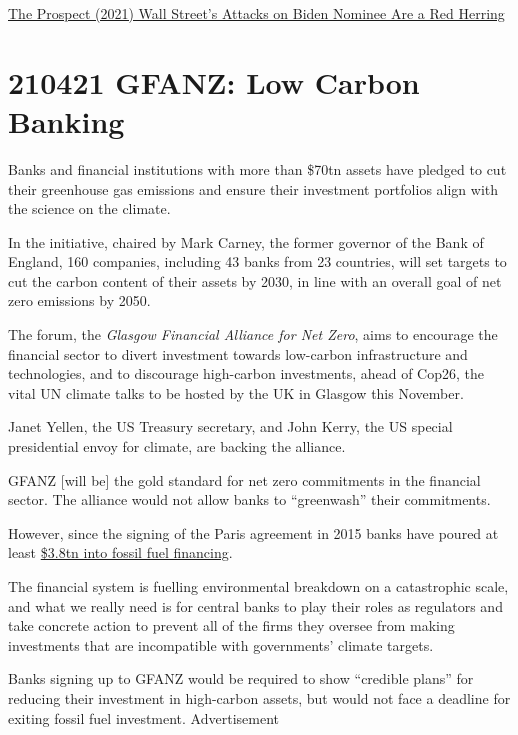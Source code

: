 \documentclass[
]{book}
\begin{document}
\href{https://prospect.org/economy/wall-streets-attacks-on-biden-nominee-red-herring-saule-omarova/}{The Prospect (2021) Wall Street's Attacks on Biden Nominee Are a Red Herring}

\hypertarget{gfanz-low-carbon-banking}{%
\section{210421 GFANZ: Low Carbon Banking}\label{gfanz-low-carbon-banking}}

Banks and financial institutions with more than \$70tn assets have pledged to cut their greenhouse gas emissions and ensure their investment portfolios align with the science on the climate.

In the initiative, chaired by Mark Carney, the former governor of the Bank of England, 160 companies, including 43 banks from 23 countries, will set targets to cut the carbon content of their assets by 2030, in line with an overall goal of net zero emissions by 2050.

The forum, the \emph{Glasgow Financial Alliance for Net Zero}, aims to encourage the financial sector to divert investment towards low-carbon infrastructure and technologies, and to discourage high-carbon investments, ahead of Cop26, the vital UN climate talks to be hosted by the UK in Glasgow this November.

Janet Yellen, the US Treasury secretary, and John Kerry, the US special presidential envoy for climate, are backing the alliance.

GFANZ {[}will be{]} the gold standard for net zero commitments in the financial sector.
The alliance would not allow banks to ``greenwash'' their commitments.

However, since the signing of the Paris agreement in 2015 banks have poured at least
\href{https://www.theguardian.com/environment/2021/mar/24/big-banks-trillion-dollar-finance-for-fossil-fuels-shocking-says-report}{\$3.8tn into fossil fuel financing}.

The financial system is fuelling environmental breakdown on a catastrophic scale, and what we really need is for central banks to play their roles as regulators and take concrete action to prevent all of the firms they oversee from making investments that are incompatible with governments' climate targets.

Banks signing up to GFANZ would be required to show ``credible plans'' for reducing their investment in high-carbon assets, but would not face a deadline for exiting fossil fuel investment.
Advertisement
\end{document}
